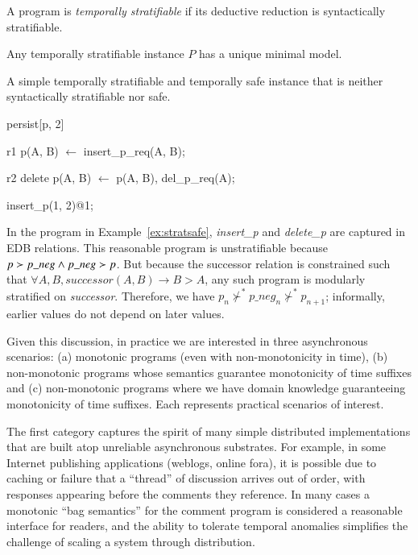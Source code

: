 \begin{definition} 
%
A \slang program is \emph{temporally stratifiable} if its deductive
reduction is syntactically stratifiable.
%
\end{definition}

\begin{lemma}
\label{lemma:temp-strat-uniq}
%
Any temporally stratifiable \slang instance $P$ has a unique minimal model.
%
\end{lemma} 


\begin{example}
\label{ex:stratsafe}
A simple temporally stratifiable and temporally safe \slang instance that is neither syntactically stratifiable nor safe.

\begin{Dedalus}
persist[p, 2]  
  
r1
p(A, B) \(\leftarrow\)
  insert\_p\_req(A, B);

r2  
delete p(A, B) \(\leftarrow\)
  p(A, B),
  del\_p\_req(A);

insert\_p(1, 2)@1;
\end{Dedalus}
\end{example}

In the \slang program in Example~\ref{ex:stratsafe}, 
\emph{insert\_p} and \emph{delete\_p} are captured
in EDB relations.  This reasonable program is unstratifiable because $p \succ
p\nega \land p\nega \succ p$.  But because the successor relation is
constrained such that $\forall A,B, successor(A, B) \rightarrow B > A$, any
such program is modularly stratified on \emph{successor}.  Therefore, we have
$p_{n} \not\succ^* p\_neg_{n} \not\succ^* p_{n+1}$; informally, earlier values
do not depend on later values.

Given this discussion, in practice we are interested in three asynchronous scenarios: (a) monotonic programs (even with non-monotonicity in time), (b) non-monotonic programs whose semantics guarantee monotonicity of time suffixes  and (c) non-monotonic programs where we have domain knowledge guaranteeing monotonicity of time suffixes.  Each represents practical scenarios of interest.

The first category captures the spirit of many simple distributed implementations that are built atop unreliable asynchronous substrates.  For example, in some Internet publishing applications (weblogs, online fora), it is possible due to caching or failure that a ``thread'' of discussion arrives out of order, with responses appearing before the comments they reference.  In many cases a monotonic ``bag semantics'' for the comment program is considered a reasonable interface for readers, and the ability to tolerate temporal anomalies simplifies the challenge of scaling a system through distribution.

